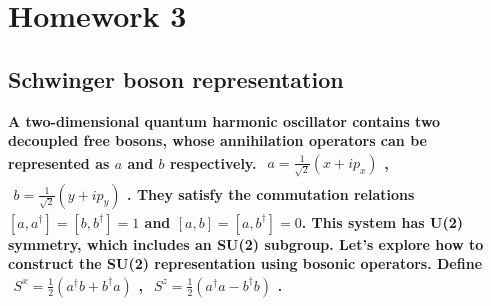 \documentclass[../../main.tex]{subfiles}
\begin{document}
\section{Homework 3}
\subsection{Schwinger boson representation}
\textbf{A two-dimensional quantum harmonic oscillator contains two decoupled free bosons, whose annihilation operators can be represented as $a$ and $b$ respectively. $\begin{aligned}
  a = \frac{1}{\sqrt{2}}(x + ip_{x})
\end{aligned}$, $\begin{aligned}
  b = \frac{1}{\sqrt{2}}(y + ip_{y})
\end{aligned}$. They satisfy the commutation relations $[a, a^{\dagger}] = [b, b^{\dagger}] = 1$ and $[a, b] = [a, b^{\dagger}] = 0$. This system has U(2) symmetry, which includes an SU(2) subgroup. Let's explore how to construct the SU(2) representation using bosonic operators. Define $\begin{aligned}
  S^{x}=\frac{1}{2}(a^{\dagger}b + b^{\dagger}a)
\end{aligned}$, $\begin{aligned}
  S^{z} = \frac{1}{2}(a^{\dagger}a - b^{\dagger}b)
\end{aligned}$.}
\end{document}
